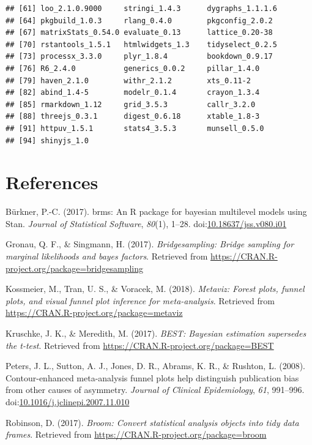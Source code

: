 \documentclass[floatsintext,doc]{apa6}
\begin{document}
\begin{verbatim}
## [61] loo_2.1.0.9000     stringi_1.4.3      dygraphs_1.1.1.6  
## [64] pkgbuild_1.0.3     rlang_0.4.0        pkgconfig_2.0.2   
## [67] matrixStats_0.54.0 evaluate_0.13      lattice_0.20-38   
## [70] rstantools_1.5.1   htmlwidgets_1.3    tidyselect_0.2.5  
## [73] processx_3.3.0     plyr_1.8.4         bookdown_0.9.17   
## [76] R6_2.4.0           generics_0.0.2     pillar_1.4.0      
## [79] haven_2.1.0        withr_2.1.2        xts_0.11-2        
## [82] abind_1.4-5        modelr_0.1.4       crayon_1.3.4      
## [85] rmarkdown_1.12     grid_3.5.3         callr_3.2.0       
## [88] threejs_0.3.1      digest_0.6.18      xtable_1.8-3      
## [91] httpuv_1.5.1       stats4_3.5.3       munsell_0.5.0     
## [94] shinyjs_1.0
\end{verbatim}

\newpage

\hypertarget{references}{%
\section{References}\label{references}}

\setlength{\parindent}{-0.5in}
\setlength{\leftskip}{0.5in}
\setlength{\parskip}{8pt}

\noindent

\hypertarget{refs}{}
\leavevmode\hypertarget{ref-R-brms}{}%
Bürkner, P.-C. (2017). brms: An R package for bayesian multilevel models using Stan. \emph{Journal of Statistical Software}, \emph{80}(1), 1--28. doi:\href{https://doi.org/10.18637/jss.v080.i01}{10.18637/jss.v080.i01}

\leavevmode\hypertarget{ref-R-bridgesampling}{}%
Gronau, Q. F., \& Singmann, H. (2017). \emph{Bridgesampling: Bridge sampling for marginal likelihoods and bayes factors}. Retrieved from \url{https://CRAN.R-project.org/package=bridgesampling}

\leavevmode\hypertarget{ref-R-metaviz}{}%
Kossmeier, M., Tran, U. S., \& Voracek, M. (2018). \emph{Metaviz: Forest plots, funnel plots, and visual funnel plot inference for meta-analysis}. Retrieved from \url{https://CRAN.R-project.org/package=metaviz}

\leavevmode\hypertarget{ref-R-BEST}{}%
Kruschke, J. K., \& Meredith, M. (2017). \emph{BEST: Bayesian estimation supersedes the t-test}. Retrieved from \url{https://CRAN.R-project.org/package=BEST}

\leavevmode\hypertarget{ref-peters2008}{}%
Peters, J. L., Sutton, A. J., Jones, D. R., Abrams, K. R., \& Rushton, L. (2008). Contour-enhanced meta-analysis funnel plots help distinguish publication bias from other causes of asymmetry. \emph{Journal of Clinical Epidemiology}, \emph{61}, 991--996. doi:\href{https://doi.org/10.1016/j.jclinepi.2007.11.010}{10.1016/j.jclinepi.2007.11.010}

\leavevmode\hypertarget{ref-R-broom}{}%
Robinson, D. (2017). \emph{Broom: Convert statistical analysis objects into tidy data frames}. Retrieved from \url{https://CRAN.R-project.org/package=broom}
\end{document}
